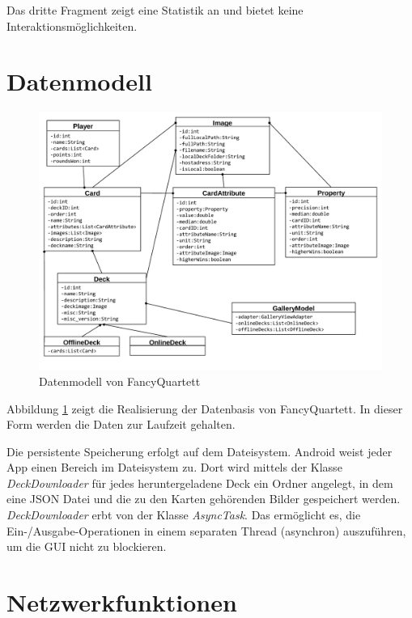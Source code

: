 Das dritte Fragment zeigt eine Statistik an und bietet keine Interaktionsmöglichkeiten.

\section{Datenmodell}
\label{sec:datenmodell}

\begin{figure}[ht]
    \centering
    \includegraphics[width=\textwidth]{../img/Datenmodell.pdf}
    \caption{Datenmodell von FancyQuartett}
    \label{fig:datenmodell}
\end{figure}

Abbildung \ref{fig:datenmodell} zeigt die Realisierung der Datenbasis von FancyQuartett. In dieser Form werden die Daten zur Laufzeit gehalten.

Die persistente Speicherung erfolgt auf dem Dateisystem. Android weist jeder App einen Bereich im Dateisystem zu. Dort wird mittels der Klasse \emph{DeckDownloader} für jedes heruntergeladene Deck ein Ordner angelegt, in dem eine JSON Datei und die zu den Karten gehörenden Bilder gespeichert werden. \emph{DeckDownloader} erbt von der Klasse \emph{AsyncTask}. Das ermöglicht es, die Ein-/Ausgabe-Operationen in einem separaten Thread (asynchron) auszuführen, um die GUI nicht zu blockieren.

\section{Netzwerkfunktionen}
\label{sec:netzwerkfunktionen}

